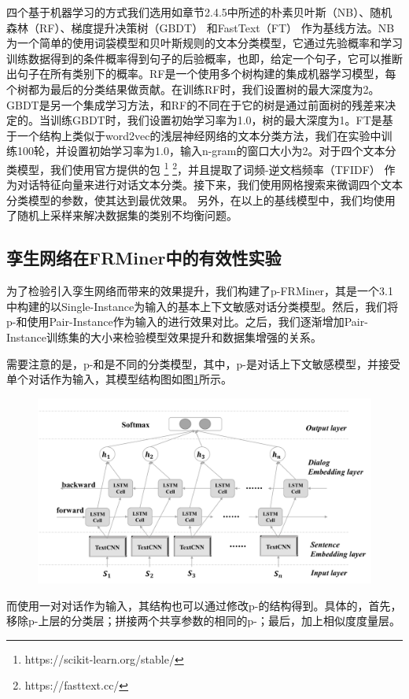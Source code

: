 四个基于机器学习的方式我们选用如章节2.4.5中所述的朴素贝叶斯（NB）\cite{mccallum1998comparison}、随机森林（RF）\cite{liaw2002classification}、梯度提升决策树（GBDT）\cite{ke2017lightgbm} 和FastText（FT）\cite{joulin2016bag} 作为基线方法。NB为一个简单的使用词袋模型和贝叶斯规则的文本分类模型，它通过先验概率和学习训练数据得到的条件概率得到句子的后验概率，也即，给定一个句子，它可以推断出句子在所有类别下的概率。RF是一个使用多个树构建的集成机器学习模型，每个树都为最后的分类结果做贡献。在训练RF时，我们设置树的最大深度为2。GBDT是另一个集成学习方法，和RF的不同在于它的树是通过前面树的残差来决定的。当训练GBDT时，我们设置初始学习率为1.0，树的最大深度为1。FT是基于一个结构上类似于word2vec的浅层神经网络的文本分类方法，我们在实验中训练100轮，并设置初始学习率为1.0，输入n-gram的窗口大小为2。对于四个文本分类模型，我们使用官方提供的包 \footnote{https://scikit-learn.org/stable/} \footnote{https://fasttext.cc/}，并且提取了词频-逆文档频率（TFIDF）\cite{joachims1996probabilistic} 作为对话特征向量来进行对话文本分类。接下来，我们使用网格搜索来微调四个文本分类模型的参数，使其达到最优效果。
另外，在以上的基线模型中，我们均使用了随机上采样\cite{ling1998data}来解决数据集的类别不均衡问题。

\subsection{孪生网络在FRMiner中的有效性实验}
为了检验引入孪生网络而带来的效果提升，我们构建了p-FRMiner，其是一个3.1中构建的以Single-Instance为输入的基本上下文敏感对话分类模型。然后，我们将p-{\tool}和使用Pair-Instance作为输入的{\tool}进行效果对比。之后，我们逐渐增加Pair-Instance训练集的大小来检验模型效果提升和数据集增强的关系。

需要注意的是，p-{\tool}和{\tool}是不同的分类模型，其中，p-{\tool}是对话上下文敏感模型，并接受单个对话作为输入，其模型结构图如图\ref{fig:model}所示。
\begin{figure}[htbp]
    \centering
    \includegraphics[width=\textwidth]{Img/model.pdf}
    \label{fig:model}
\end{figure}
而{\tool}使用一对对话作为输入，其结构也可以通过修改p-{\tool}的结构得到。具体的，首先，移除p-{\tool}上层的分类层；拼接两个共享参数的相同的p-{\tool}；最后，加上相似度度量层。

